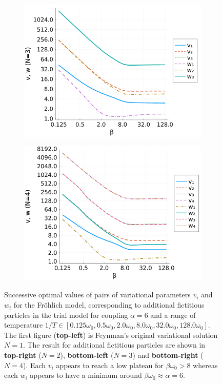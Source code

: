 \begin{figure}[!tbp]
\begin{subfigure}[b]{0.49\textwidth}
    \includegraphics[width=\textwidth]{figures/vw_beta_N3.png}
  \end{subfigure}
  \hfill
  \begin{subfigure}[b]{0.49\textwidth}
    \centering
    \includegraphics[width=\textwidth]{figures/vw_beta_N4.png}
  \end{subfigure}
  \caption{Successive optimal values of pairs of variational parameters $v_i$ and $w_i$ for the Fr\"ohlich model, corresponding to additional fictitious particles in the trial model for coupling $\alpha = 6$ and a range of temperature $1/T \in [0.125 \omega_0, 0.5 \omega_0, 2.0 \omega_0, 8.0 \omega_0, 32.0 \omega_0, 128.0 \omega_0]$. The first figure (\textbf{top-left}) is Feynman's original variational solution $N=1$. The result for additional fictitious particles are shown in \textbf{top-right} ($N=2$), \textbf{bottom-left} ($N=3$) and \textbf{bottom-right} ($N=4$). Each $v_i$ appears to reach a low plateau for $\beta \omega_0 > 8$ whereas each $w_i$ appears to have a minimum around $\beta\omega_0 \approx \alpha = 6$.}
  \label{fig:multivwbeta}
\end{figure}

